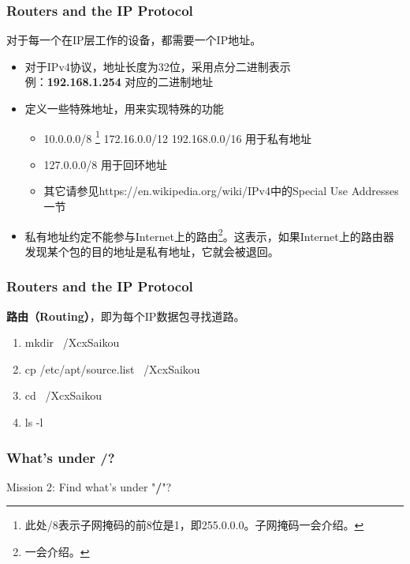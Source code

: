 \documentclass[11pt]{beamer}
\begin{document}
\begin{frame}
\frametitle{Routers and the IP Protocol}
对于每一个在IP层工作的设备，都需要一个IP地址。
\begin{itemize}
\item 对于IPv4协议，地址长度为32位，采用点分二进制表示\\
例：\textbf{192.168.1.254} 对应的二进制地址
\item 定义一些特殊地址，用来实现特殊的功能
\begin{itemize}
\item 10.0.0.0/8 \footnote{此处/8表示子网掩码的前8位是1，即255.0.0.0。子网掩码一会介绍。} 172.16.0.0/12 192.168.0.0/16 用于私有地址
\item 127.0.0.0/8 用于回环地址
\item 其它请参见https://en.wikipedia.org/wiki/IPv4中的Special Use Addresses一节
\end{itemize}
\item 私有地址约定不能参与Internet上的路由\footnote{一会介绍。}。这表示，如果Internet上的路由器发现某个包的目的地址是私有地址，它就会被退回。
\end{itemize}
\end{frame}

\begin{frame}
\frametitle{Routers and the IP Protocol}
\textbf{路由（Routing）}，即为每个IP数据包寻找道路。
\begin{enumerate}
\item mkdir ~/XcxSaikou
\item cp /etc/apt/source.list ~/XcxSaikou
\item cd ~/XcxSaikou
\item ls -l
\end{enumerate}
\end{frame}


\begin{frame}
\frametitle{What's under \textbf{/}?}
Mission 2: Find what's under "\textbf{/}"?
\end{frame}
\end{document}
